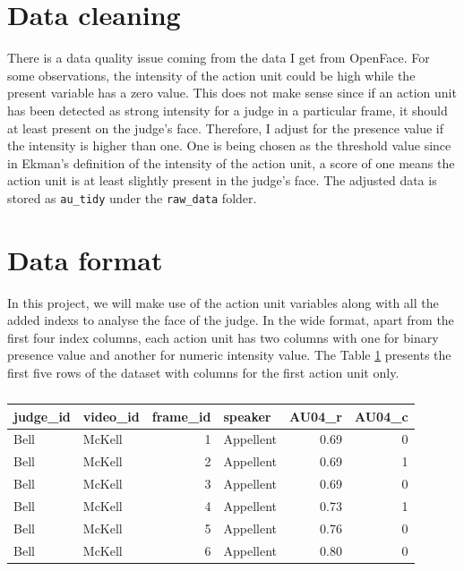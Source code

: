 \documentclass{monashthesis}
\begin{document}
\hypertarget{data-cleaning}{%
\section{Data cleaning}\label{data-cleaning}}

There is a data quality issue coming from the data I get from OpenFace. For some observations, the intensity of the action unit could be high while the present variable has a zero value. This does not make sense since if an action unit has been detected as strong intensity for a judge in a particular frame, it should at least present on the judge's face. Therefore, I adjust for the presence value if the intensity is higher than one. One is being chosen as the threshold value since in Ekman's definition of the intensity of the action unit, a score of one means the action unit is at least slightly present in the judge's face. The adjusted data is stored as \texttt{au\_tidy} under the \texttt{raw\_data} folder.

\hypertarget{data-format}{%
\section{Data format}\label{data-format}}

In this project, we will make use of the action unit variables along with all the added indexs to analyse the face of the judge. In the wide format, apart from the first four index columns, each action unit has two columns with one for binary presence value and another for numeric intensity value. The Table \ref{tab:wide} presents the first five rows of the dataset with columns for the first action unit only.

\begin{table}[t]

\caption{\label{tab:unnamed-chunk-2}\label{tab:wide}}
\centering
\begin{tabular}{l|l|r|l|r|r}
\hline
judge\_id & video\_id & frame\_id & speaker & AU04\_r & AU04\_c\\
\hline
Bell & McKell & 1 & Appellent & 0.69 & 0\\
\hline
Bell & McKell & 2 & Appellent & 0.69 & 1\\
\hline
Bell & McKell & 3 & Appellent & 0.69 & 0\\
\hline
Bell & McKell & 4 & Appellent & 0.73 & 1\\
\hline
Bell & McKell & 5 & Appellent & 0.76 & 0\\
\hline
Bell & McKell & 6 & Appellent & 0.80 & 0\\
\hline
\end{tabular}
\end{table}
\end{document}
